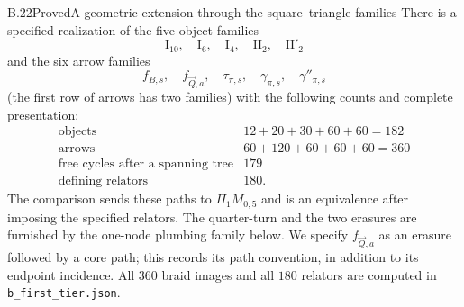 
\begin{result}{B.22}{Proved}{A geometric extension through the square--triangle families}
There is a specified realization of the five object families
\[
 \mathrm I_{10},\quad\mathrm I_6,\quad\mathrm I_4,
 \quad\mathrm {II}_2,\quad\mathrm {II}'_2
\]
and the six arrow families
\[
 f_{B,s},\quad f_{\vec Q,a},\quad\tau_{\pi,s},
 \quad\gamma_{\pi,s},\quad\gamma''_{\pi,s}
\]
(the first row of arrows has two families) with the following
counts and complete presentation:
\[
\begin{array}{c|r}
 \text{objects}&12+20+30+60+60=182\\
 \text{arrows}&60+120+60+60+60=360\\
 \text{free cycles after a spanning tree}&179\\
 \text{defining relators}&180.
\end{array}                                                     \tag{B.45}
\]
The comparison sends these paths to $\Pi_1M_{0,5}$ and is an
equivalence after imposing the specified relators.  The
quarter-turn and the two erasures are furnished by the
one-node plumbing family below.  We specify $f_{\vec Q,a}$
as an erasure followed by a core path; this records its
path convention, in addition to its endpoint incidence.
All $360$ braid images and all $180$ relators are computed
in \texttt{b\_first\_tier.json}.
\end{result}
